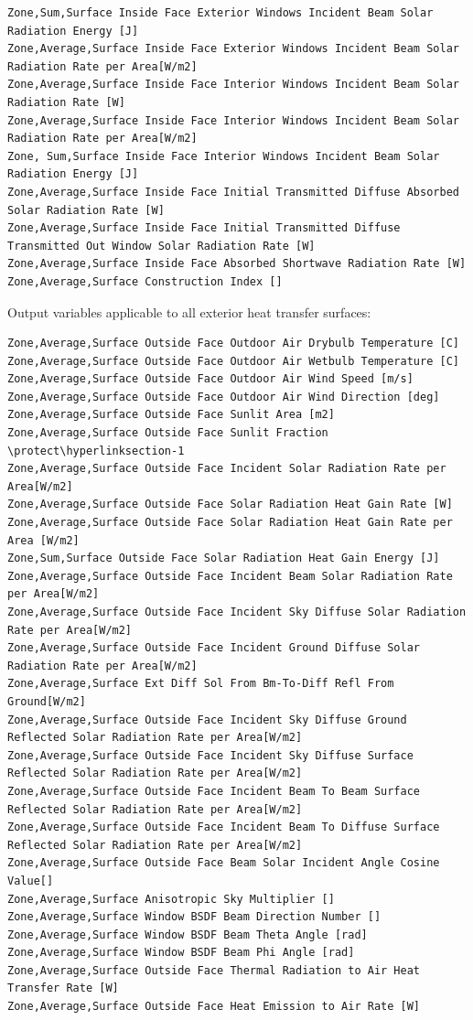 \begin{lstlisting}
Zone,Sum,Surface Inside Face Exterior Windows Incident Beam Solar Radiation Energy [J]
Zone,Average,Surface Inside Face Exterior Windows Incident Beam Solar Radiation Rate per Area[W/m2]
Zone,Average,Surface Inside Face Interior Windows Incident Beam Solar Radiation Rate [W]
Zone,Average,Surface Inside Face Interior Windows Incident Beam Solar Radiation Rate per Area[W/m2]
Zone, Sum,Surface Inside Face Interior Windows Incident Beam Solar Radiation Energy [J]
Zone,Average,Surface Inside Face Initial Transmitted Diffuse Absorbed Solar Radiation Rate [W]
Zone,Average,Surface Inside Face Initial Transmitted Diffuse Transmitted Out Window Solar Radiation Rate [W]
Zone,Average,Surface Inside Face Absorbed Shortwave Radiation Rate [W]
Zone,Average,Surface Construction Index []
\end{lstlisting}

Output variables applicable to all exterior heat transfer surfaces:

\begin{lstlisting}
Zone,Average,Surface Outside Face Outdoor Air Drybulb Temperature [C]
Zone,Average,Surface Outside Face Outdoor Air Wetbulb Temperature [C]
Zone,Average,Surface Outside Face Outdoor Air Wind Speed [m/s]
Zone,Average,Surface Outside Face Outdoor Air Wind Direction [deg]
Zone,Average,Surface Outside Face Sunlit Area [m2]
Zone,Average,Surface Outside Face Sunlit Fraction \protect\hyperlinksection-1
Zone,Average,Surface Outside Face Incident Solar Radiation Rate per Area[W/m2]
Zone,Average,Surface Outside Face Solar Radiation Heat Gain Rate [W]
Zone,Average,Surface Outside Face Solar Radiation Heat Gain Rate per Area [W/m2]
Zone,Sum,Surface Outside Face Solar Radiation Heat Gain Energy [J]
Zone,Average,Surface Outside Face Incident Beam Solar Radiation Rate per Area[W/m2]
Zone,Average,Surface Outside Face Incident Sky Diffuse Solar Radiation Rate per Area[W/m2]
Zone,Average,Surface Outside Face Incident Ground Diffuse Solar Radiation Rate per Area[W/m2]
Zone,Average,Surface Ext Diff Sol From Bm-To-Diff Refl From Ground[W/m2]
Zone,Average,Surface Outside Face Incident Sky Diffuse Ground Reflected Solar Radiation Rate per Area[W/m2]
Zone,Average,Surface Outside Face Incident Sky Diffuse Surface Reflected Solar Radiation Rate per Area[W/m2]
Zone,Average,Surface Outside Face Incident Beam To Beam Surface Reflected Solar Radiation Rate per Area[W/m2]
Zone,Average,Surface Outside Face Incident Beam To Diffuse Surface Reflected Solar Radiation Rate per Area[W/m2]
Zone,Average,Surface Outside Face Beam Solar Incident Angle Cosine Value[]
Zone,Average,Surface Anisotropic Sky Multiplier []
Zone,Average,Surface Window BSDF Beam Direction Number []
Zone,Average,Surface Window BSDF Beam Theta Angle [rad]
Zone,Average,Surface Window BSDF Beam Phi Angle [rad]
Zone,Average,Surface Outside Face Thermal Radiation to Air Heat Transfer Rate [W]
Zone,Average,Surface Outside Face Heat Emission to Air Rate [W]
\end{lstlisting}

